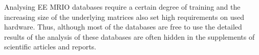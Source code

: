 Analysing EE MRIO databases require a certain degree of training and the
increasing size of the underlying matrices also set high requirements on used hardware. Thus, although most of the databases are free to use the detailed results of the analysis of these databases are often hidden in the supplements of scientific articles and reports.